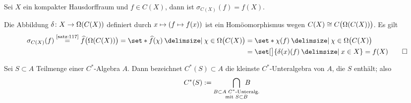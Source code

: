 \begin{bemerkung}[label=bem217,{name=[Spektrum von $f \in C(X)$ für $X$ kompakt]}]
	Sei $X$ ein kompakter Hausdorffraum und $f \in C(X)$, dann ist $\sigma_{C(X)}(f)=f(X)$.
\end{bemerkung}
\begin{beweis}
	Die Abbildung $\delta \colon X \to \Omega\enbrace*{C(X)}$ definiert durch $x \mapsto \enbrace*{f \mapsto f(x)}$ ist ein Homöomorphismus wegen $C(X) \cong C \enbrace[\big]{\Omega(C(X))}$. 
	Es gilt
	\begin{align}
		\sigma_{C(X)}(f) \StackText{\ref{satz:117}}{=} \widehat{f} \enbrace[\big]{\Omega(C(X))} = \set*{\widehat{f}(\chi) \given \chi \in \Omega \enbrace[\big]{C(X)}} 
		&= \set*{\chi(f) \given \chi \in \Omega \enbrace[\big]{C(X)}} \\
		&= \set[\big]{\delta(x)(f) \given x \in X} = f(X) \qedhere
	\end{align}
\end{beweis}

\begin{definition}[{name=[erzeuge C*-Algebra]}]
	Sei $S \subset A$ Teilmenge einer $C^*$-Algebra $A$.
	Dann bezeichnet $C^*(S) \subset A$ die kleinste $C^*$-Unteralgebra von $A$, die $S$ enthält; also
	\[
		C^*(S) := \smashoperator[r]{\bigcap_{\substack{B \subset A \text{ $C^*$-Unteralg.}\\ \text{mit } S \subset B}}} \enspace B
	\]
\end{definition}

